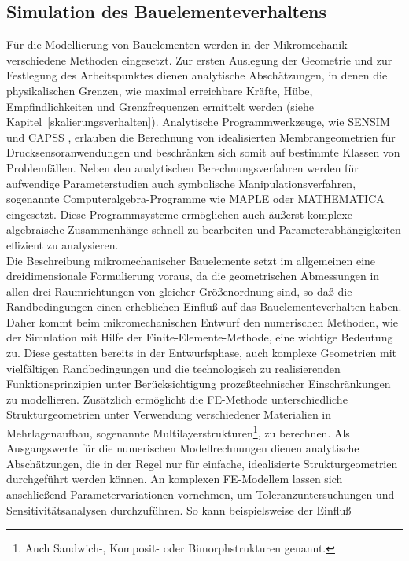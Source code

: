 \subsection{Simulation des Bauelementeverhaltens}
\label{devicemodeling}

Für die Modellierung von Bauelementen werden in der Mikromechanik
verschiedene Methoden eingesetzt. Zur ersten Auslegung der Geometrie und
zur Festlegung des Arbeitspunktes dienen analytische
Abschätzungen, in denen die physikalischen Grenzen, wie maximal
erreichbare Kräfte, Hübe, Empfindlichkeiten und Grenzfrequenzen
ermittelt werden (siehe Kapitel~\ref{skalierungsverhalten}).
Analytische Programmwerkzeuge,
wie {\sf SENSIM} \cite{Lee82} und {\sf CAPSS} \cite{Bin87},
erlauben die Berechnung
von idealisierten Membrangeometrien für Drucksensoranwendungen und
beschränken sich somit auf bestimmte Klassen von Problemfällen. Neben
den analytischen Berechnungsverfahren werden für aufwendige
Parameterstudien auch symbolische Manipulationsverfahren, sogenannte
Computeralgebra-Programme wie {\sf MAPLE} \cite{Cha91} oder {\sf MATHEMATICA}
\cite{Wol91} eingesetzt. Diese Programmsysteme ermöglichen auch äußerst
komplexe algebraische Zusammenhänge schnell zu bearbeiten und
Parameterabhängigkeiten effizient zu analysieren.\\
  Die Beschreibung
mikromechanischer Bauelemente setzt im allgemeinen eine dreidimensionale
Formulierung voraus, da die geometrischen Abmessungen in allen drei
Raumrichtungen von gleicher Größenordnung sind, so daß die
Randbedingungen einen erheblichen Einfluß auf das Bauelementeverhalten
haben. Daher kommt beim mikromechanischen Entwurf den numerischen Methoden,
wie der Simulation mit Hilfe der Finite-Elemente-Methode, eine wichtige
Bedeutung zu. Diese gestatten bereits in der Entwurfsphase, auch komplexe
Geometrien mit vielfältigen Randbedingungen und die technologisch zu
realisierenden Funktionsprinzipien unter Berücksichtigung prozeßtechnischer
Einschränkungen zu modellieren. Zusätzlich ermöglicht die FE-Methode
unterschiedliche Strukturgeometrien unter Verwendung
verschiedener Materialien in Mehrlagenaufbau, sogenannte
Multilayerstrukturen\footnote {Auch Sandwich-, Komposit- oder
Bimorphstrukturen genannt.}, zu berechnen. Als Ausgangswerte für die
numerischen Modellrechnungen dienen analytische Abschätzungen, die in
der Regel nur für einfache, idealisierte Strukturgeome\-trien durchgeführt
werden können. An komplexen FE-Modellem lassen sich anschließend
Parametervariationen vornehmen, um Toleranzuntersuchungen und
Sensitivitätsanalysen durchzuführen. So kann beispielsweise der Einfluß
